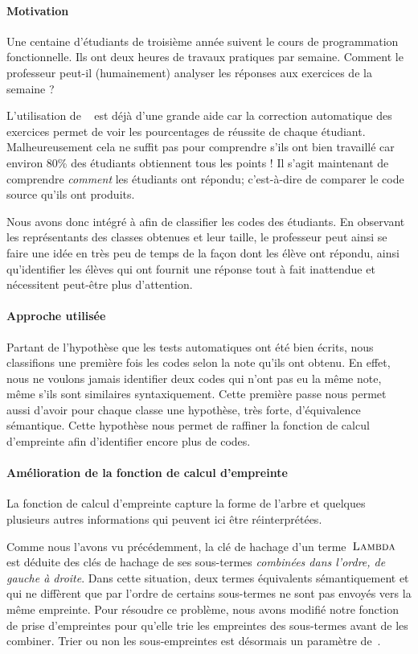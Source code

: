 \paragraph{Motivation}
Une centaine d'étudiants de troisième année suivent le cours de
programmation fonctionnelle. Ils ont deux heures de travaux pratiques
par semaine. Comment le professeur peut-il (humainement) analyser les
réponses aux exercices de la semaine ?

L'utilisation de {\LearnOCaml}~\cite{learnocaml} est déjà d'une grande
aide car la correction automatique des exercices permet de voir les
pourcentages de réussite de chaque étudiant. Malheureusement cela ne
suffit pas pour comprendre s'ils ont bien travaillé car environ 80\%
des étudiants obtiennent tous les points ! Il s'agit maintenant de
comprendre \emph{comment} les étudiants ont répondu; c'est-à-dire de
comparer le code source qu'ils ont produits.

Nous avons donc intégré {\Asak} à {\LearnOCaml} afin de classifier les
codes des étudiants. En observant les représentants des classes
obtenues et leur taille, le professeur peut ainsi se faire une idée en
très peu de temps de la façon dont les élève ont répondu, ainsi
qu'identifier les élèves qui ont fournit une réponse tout à fait
inattendue et nécessitent peut-être plus d'attention.

\paragraph{Approche utilisée}
Partant de l'hypothèse que les tests automatiques ont été bien écrits,
nous classifions une première fois les codes selon la note qu'ils ont
obtenu. En effet, nous ne voulons jamais identifier deux codes qui
n'ont pas eu la même note, même s'ils sont similaires
syntaxiquement. Cette première passe nous permet aussi d'avoir pour
chaque classe une hypothèse, très forte, d'équivalence sémantique.
Cette hypothèse nous permet de raffiner la fonction de calcul
d'empreinte afin d'identifier encore plus de codes.

\paragraph{Amélioration de la fonction de calcul d'empreinte}
La fonction de calcul d'empreinte capture la forme de l'arbre et
quelques plusieurs autres informations qui peuvent ici être
réinterprétées.

Comme nous l'avons vu précédemment, la clé de hachage d'un
terme~$\textsc{Lambda}$ est déduite des clés de hachage de ses sous-termes
\textit{combinées dans l'ordre, de gauche à droite}. Dans cette
situation, deux termes équivalents sémantiquement et qui ne diffèrent
que par l'ordre de certains sous-termes ne sont pas envoyés vers la
même empreinte. Pour résoudre ce problème, nous avons modifié notre
fonction de prise d'empreintes pour qu'elle trie les empreintes des
sous-termes avant de les combiner. Trier ou non les sous-empreintes
est désormais un paramètre de~{\Asak}.


